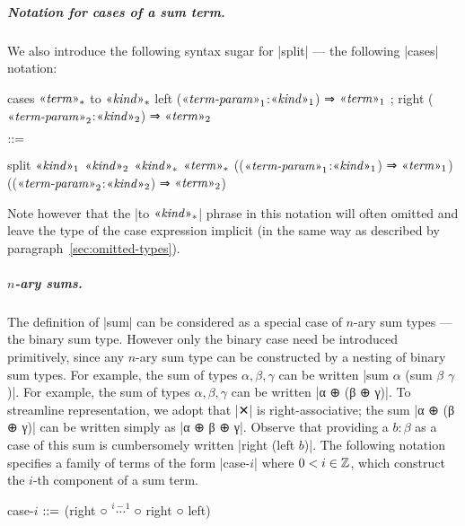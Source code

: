 \newpage
\subparagraph{Notation for cases of a sum term.}
We also introduce the following syntax sugar for \code|split| --- the following \code|cases| notation:
\begin{notational}[caption={Notation for \code|case|.}]
cases $\mvar{term}_*$ to $\mvar{kind}_*$
  { left ($\mvar{term-param}_1$:$\mvar{kind}_1$) ⇒ $\mvar{term}_1$
  ; right ($\mvar{term-param}_2$:$\mvar{kind}_2$) ⇒ $\mvar{term}_2$ }

$\syneq$

split $\mvar{kind}_1$ $\mvar{kind}_2$ $\mvar{kind}_*$
  $\mvar{term}_*$
  (($\mvar{term-param}_1$:$\mvar{kind}_1$) ⇒ $\mvar{term}_1$)
  (($\mvar{term-param}_2$:$\mvar{kind}_2$) ⇒ $\mvar{term}_2$)
\end{notational}
Note however that the \code|to $\mvar{kind}_*$| phrase in this notation will often omitted and leave the type of the case expression implicit (in the same way as described by paragraph~\ref{sec:omitted-types}).

\subparagraph{$n$-ary sums.}
The definition of \code|sum| can be considered as a special case of $n$-ary sum types --- the binary sum type.
However only the binary case need be introduced primitively, since any $n$-ary sum type can be constructed by a nesting of binary sum types.
For example, the sum of types $α, β, γ$ can be written \code|sum $α$ (sum $β$ $γ$)|.
For example, the sum of types $α, β, γ$ can be written \code|α ⊕ (β ⊕ γ)|.
To streamline representation, we adopt that \code|✕| is right-associative; the sum \code|α ⊕ (β ⊕ γ)| can be written simply as \code|α ⊕ β ⊕ γ|.
Observe that providing a $b:β$ as a case of this sum is cumbersomely written \code|right (left $b$)|.
The following notation specifies a family of terms of the form \code|case-$i$| where $0 < i \in \Z$, which construct the $i$-th component of a sum term.
\begin{notational}
case-$i$   $\syneq$   (right ○ $\stackrel{i-1}{\cdots}$ ○ right ○ left)
\end{notational}

